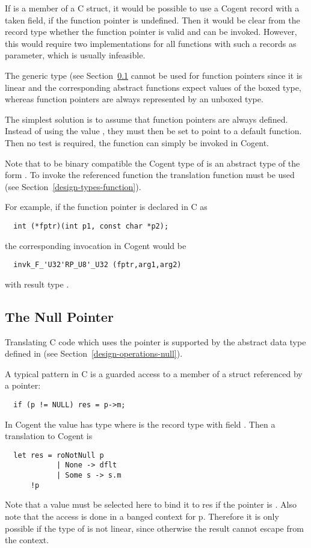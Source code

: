 If  is a member of a C struct, it would be possible to use a Cogent record with a taken field,
if the function pointer is undefined. Then it would be clear from the record type whether the function pointer
is valid and can be invoked. However, this would require two implementations for all functions with such a records 
as parameter, which is usually infeasible.

The generic type  (see Section~\ref{app-trans-null} cannot be used for function pointers since
it is linear and the corresponding abstract functions expect values of the boxed type, whereas function pointers
are always represented by an unboxed type.

The simplest solution is to assume that function pointers are always defined. Instead of using the value 
, they must then be set to point to a default function. Then no test is required, the function
can simply be invoked in Cogent.

Note that to be binary compatible the Cogent type of  is an abstract type of the form .
To invoke the referenced function the translation function  must be used (see 
Section~\ref{design-types-function}). 

For example, if the function pointer is declared in C as 
\begin{verbatim}
  int (*fptr)(int p1, const char *p2);
\end{verbatim}
the corresponding invocation in Cogent would be
\begin{verbatim}
  invk_F_'U32'RP_U8'_U32 (fptr,arg1,arg2)
\end{verbatim}
with result type .

\subsection{The Null Pointer}
\label{app-trans-null}

Translating C code which uses the  pointer is supported by the abstract data type  defined
in  (see Section~\ref{design-operations-null}).

A typical pattern in C is a guarded access to a member of a struct referenced by a pointer:
\begin{verbatim}
  if (p != NULL) res = p->m;
\end{verbatim}
In Cogent the value  has type  where  is the record type with field . 
Then a translation to Cogent is
\begin{verbatim}
  let res = roNotNull p 
            | None -> dflt
            | Some s -> s.m
      !p
\end{verbatim}
Note that a value  must be selected here to bind it to res if the pointer is . Also note that the access is
done in a banged context for p. Therefore it is only possible if the type of  is not linear, since otherwise the result
cannot escape from the context.


